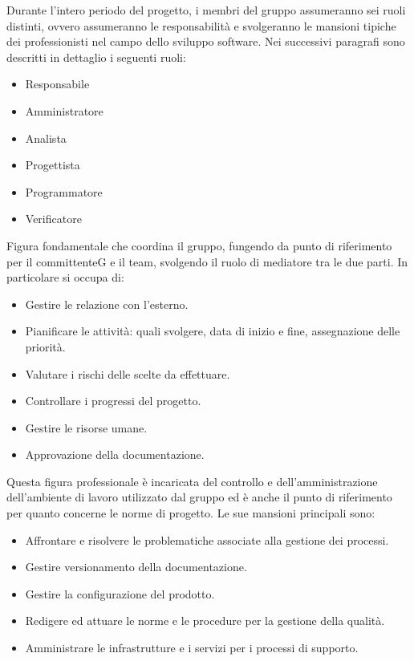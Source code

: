 Durante l’intero periodo del progetto, i membri del gruppo assumeranno sei ruoli distinti, ovvero assumeranno le responsabilità e svolgeranno le mansioni tipiche dei professionisti nel campo dello sviluppo software.
Nei successivi paragrafi sono descritti in dettaglio i seguenti ruoli:
\begin{itemize}
    \item Responsabile
    \item Amministratore
    \item Analista
    \item Progettista
    \item Programmatore
    \item Verificatore
\end{itemize}
Figura fondamentale che coordina il gruppo, fungendo da punto di riferimento per il committenteG e il team, svolgendo il ruolo di mediatore tra le due parti.
In particolare si occupa di:
\begin{itemize}
    \item Gestire le relazione con l'esterno.
    \item Pianificare le attività: quali svolgere, data di inizio e fine, assegnazione delle priorità.
    \item Valutare i rischi delle scelte da effettuare.
    \item Controllare i progressi del progetto.
    \item Gestire le risorse umane.
    \item Approvazione della documentazione.
\end{itemize}
Questa figura professionale è incaricata del controllo e dell’amministrazione dell’ambiente di lavoro utilizzato dal gruppo ed è anche il punto di riferimento per quanto concerne le norme di progetto. Le sue mansioni principali sono:
\begin{itemize}
    \item Affrontare e risolvere le problematiche associate alla gestione dei processi.
    \item Gestire versionamento della documentazione.
    \item Gestire la configurazione del prodotto.
    \item Redigere ed attuare le norme e le procedure per la gestione della qualità.
    \item Amministrare le infrastrutture e i servizi per i processi di supporto.
\end{itemize}
